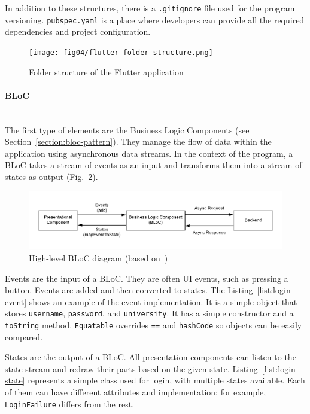 In addition to these structures, there is a \texttt{.gitignore} file used for the program versioning. \texttt{pubspec.yaml} is a place where developers can provide all the required dependencies and project configuration.

\begin{figure}[htb]
    \centering
    \texttt{[image: fig04/flutter-folder-structure.png]}
    \caption{Folder structure of the Flutter application}
    \label{fig:flutter-folder-structure}
\end{figure}


\paragraph{\large{BLoC}}\mbox{}\\[2pt]
The first type of elements are the Business Logic Components (see Section~\ref{section:bloc-pattern}). They manage the flow of data within the application using asynchronous data streams. In the context of the program, a BLoC takes a stream of events as an input and transforms them into a stream of states as output (Fig.~\ref{fig:bloc-diagram}).

\begin{figure}[htb]
    \centering
    \includegraphics[width=.8\linewidth]{fig04/bloc_diagram.pdf}
    \caption{High-level BLoC diagram (based on~\cite{bloc-diagram})}
    \label{fig:bloc-diagram}
\end{figure}

Events are the input of a BLoC. They are often UI events, such as pressing a button. Events are added and then converted to states. The Listing~\ref{list:login-event} shows an example of the event implementation. It is a simple object that stores \texttt{username}, \texttt{password}, and \texttt{university}. It has a simple constructor and a \texttt{toString} method. \texttt{Equatable} overrides \texttt{==} and \texttt{hashCode} so objects can be easily compared.



States are the output of a BLoC. All presentation components can listen to the state stream and redraw their parts based on the given state. Listing~\ref{list:login-state} represents a simple class used for login, with multiple states available. Each of them can have different attributes and implementation; for example, \texttt{LoginFailure} differs from the rest.

